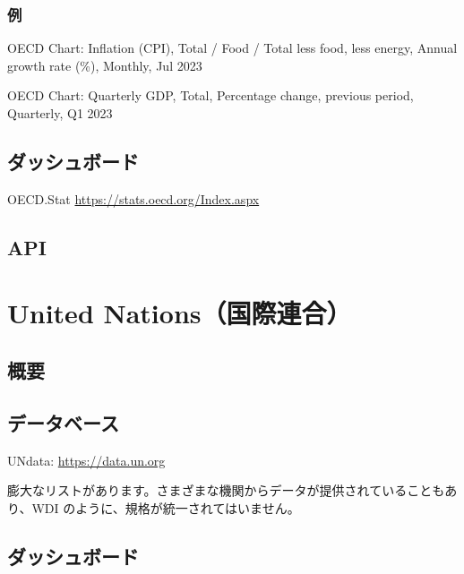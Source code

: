 \documentclass[
  xelatex, ja=standard]{bxjsbook}
\theoremstyle{definition}
\theoremstyle{definition}
\theoremstyle{definition}
\theoremstyle{definition}
\theoremstyle{remark}
\begin{document}
\hypertarget{ux4f8b}{%
\subsection{例}\label{ux4f8b}}

OECD Chart: Inflation (CPI), Total / Food / Total less food, less energy, Annual growth rate (\%), Monthly, Jul 2023

OECD Chart: Quarterly GDP, Total, Percentage change, previous period, Quarterly, Q1 2023

\hypertarget{ux30c0ux30c3ux30b7ux30e5ux30dcux30fcux30c9-1}{%
\section{ダッシュボード}\label{ux30c0ux30c3ux30b7ux30e5ux30dcux30fcux30c9-1}}

OECD.Stat \url{https://stats.oecd.org/Index.aspx}

\hypertarget{api-1}{%
\section{API}\label{api-1}}

\hypertarget{un-site}{%
\chapter{United Nations（国際連合）}\label{un-site}}

\hypertarget{ux6982ux8981-4}{%
\section{概要}\label{ux6982ux8981-4}}

\hypertarget{ux30c7ux30fcux30bfux30d9ux30fcux30b9-2}{%
\section{データベース}\label{ux30c7ux30fcux30bfux30d9ux30fcux30b9-2}}

UNdata: \url{https://data.un.org}

膨大なリストがあります。さまざまな機関からデータが提供されていることもあり、WDI のように、規格が統一されてはいません。

\hypertarget{ux30c0ux30c3ux30b7ux30e5ux30dcux30fcux30c9-2}{%
\section{ダッシュボード}\label{ux30c0ux30c3ux30b7ux30e5ux30dcux30fcux30c9-2}}
\end{document}

